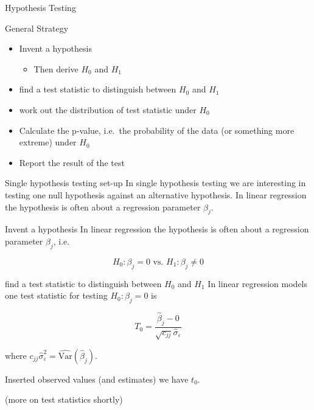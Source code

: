 \documentclass[
  ignorenonframetext,
]{beamer}
\providecommand{\tightlist}{%
  \setlength{\itemsep}{0pt}\setlength{\parskip}{0pt}}
\begin{document}
\begin{frame}{Hypothesis Testing}
\label{hypothesis-testing}
\end{frame}

\begin{frame}{General Strategy}
\label{general-strategy}
\begin{itemize}
\tightlist
\item
  Invent a hypothesis

  \begin{itemize}
  \tightlist
  \item
    Then derive \(H_0\) and \(H_1\)
  \end{itemize}
\item
  find a test statistic to distinguish between \(H_0\) and \(H_1\)
\item
  work out the distribution of test statistic under \(H_0\)
\item
  Calculate the p-value, i.e.~the probability of the data (or something
  more extreme) under \(H_0\)
\item
  Report the result of the test
\end{itemize}
\end{frame}

\begin{frame}{Single hypothesis testing set-up}
\label{single-hypothesis-testing-set-up}
In single hypothesis testing we are interesting in testing one null
hypothesis against an alternative hypothesis. In linear regression the
hypothesis is often about a regression parameter \(\beta_j\).
\end{frame}

\begin{frame}{Invent a hypothesis}
\label{invent-a-hypothesis}
In linear regression the hypothesis is often about a regression
parameter \(\beta_j\), i.e.~

\[
H_0: \beta_j=0 \text{ vs. } H_1: \beta_j\neq 0
\]
\end{frame}

\begin{frame}{find a test statistic to distinguish between \(H_0\) and
\(H_1\)}
\label{find-a-test-statistic-to-distinguish-between-h_0-and-h_1}
In linear regression models one test statistic for testing
\(H_0: \beta_j=0\) is

\[
T_0=\frac{\hat{\beta}_j-0}{\sqrt{c_{jj}}\hat{\sigma}_{\varepsilon}}
\]

where
\(c_{jj}\hat{\sigma}_{\varepsilon}^2=\widehat{\text{Var}}(\hat{\beta}_j)\).

Inserted observed values (and estimates) we have \(t_0\).

(more on test statistics shortly)
\end{frame}
\end{document}
